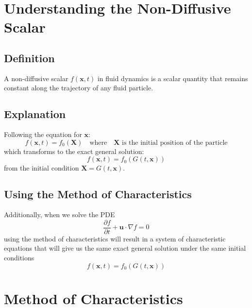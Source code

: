 \documentclass{article}
\begin{document}
\section{Understanding the Non-Diffusive Scalar}

\subsection{Definition}
A non-diffusive scalar $f(\mathbf{x}, t)$ in fluid dynamics is a scalar quantity that remains constant along the trajectory of any fluid particle.

\subsection{Explanation}
Following the equation for $\mathbf{x}$:
\begin{equation}
f(\mathbf{x}, t) = f_0(\mathbf{X}) \quad \text{where} \quad \mathbf{X} \text{ is the initial position of the particle}
\end{equation}
which transforms to the exact general solution:
\begin{equation}
f(\mathbf{x}, t) = f_0(G(t, \mathbf{x}))
\end{equation}
from the initial condition $\mathbf{X} = G(t, \mathbf{x})$.

\subsection{Using the Method of Characteristics}
Additionally, when we solve the PDE
\begin{equation}
\frac{\partial f}{\partial t} + \mathbf{u} \cdot \nabla f = 0
\end{equation}
using the method of characteristics will result in a system of characteristic equations that will give us the same exact general solution under the same initial conditions
\begin{equation}
f(\mathbf{x}, t) = f_0(G(t, \mathbf{x}))
\end{equation}

\section{Method of Characteristics}
\end{document}
